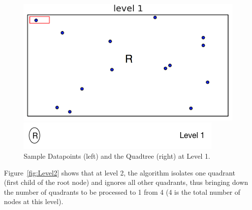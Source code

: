 \begin{figure}[H]
  \centering
  \vspace{0.5in}
  \begin{minipage}[b]{0.35\textwidth}
    \includegraphics[width=\textwidth]{Images/1_1Quad1_1}
  \end{minipage}
  \hfill
  \begin{minipage}[b]{0.5\textwidth}
    \includegraphics[width=\textwidth]{Images/1_1Quad_1_tree}
  \end{minipage}
  \vspace{0.5in}
   \caption{Sample Datapoints (left) and the Quadtree (right) at Level 1.}
   \label{fig:Level1}
\end{figure}


Figure~\ref{fig:Level2} shows that at level 2, the algorithm isolates one quadrant (first child of the root node) and ignores all other quadrants, thus bringing down the number of quadrants to be processed to 1 from 4 (4 is the total number of nodes at this level).

